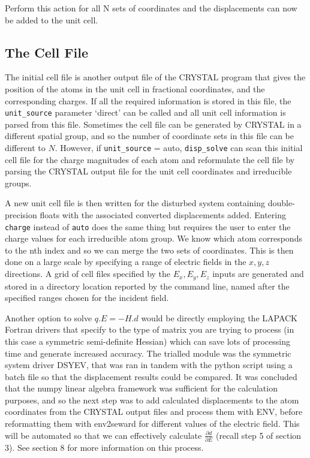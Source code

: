 \documentclass[10pt]{article}
\begin{document}
Perform this action for all N sets of coordinates and the displacements can now be added to the unit cell.
\subsection{The Cell File}

The initial cell file is another output file of the CRYSTAL program that gives the position of the atoms in the unit cell in fractional coordinates, and the corresponding charges. If all the required information is stored in this file, the \texttt{unit\_source} parameter `direct' can be called and all unit cell information is parsed from this file. Sometimes the cell file can be generated by CRYSTAL in a different spatial group, and so the number of coordinate sets in this file can be different to $N$. However, if \texttt{unit\_source} = auto, \texttt{disp\_solve} can scan this initial cell file for the charge magnitudes of each atom and reformulate the cell file by parsing the CRYSTAL output file for the unit cell coordinates and irreducible groups.

A new unit cell file is then written for the disturbed system containing double-precision floats with the associated converted displacements added. Entering \texttt{charge} instead of \texttt{auto} does the same thing but requires the user to enter the charge values for each irreducible atom group. We know which atom corresponds to the nth index and so we can merge the two sets of coordinates. This is then done on a large scale by specifying a range of electric fields in the $x,y,z$ directions. A grid of cell files specified by the $E_x,E_y,E_z$ inputs are generated and stored in a directory location reported by the command line, named after the specified ranges chosen for the incident field.

Another option to solve $q.E = -H.d$ would be directly employing the LAPACK Fortran drivers that specify to the type of matrix you are trying to process (in this case a symmetric semi-definite Hessian) which can save lots of processing time and generate increased accuracy. The trialled module was the symmetric system driver DSYEV, that was ran in tandem with the python script using a batch file so that the displacement results could be compared. It was concluded that the numpy linear algebra framework was sufficient for the calculation purposes, and so the next step was to add calculated displacements to the atom coordinates from the CRYSTAL output files and process them with ENV, before reformatting them with env2seward for different values of the electric field. This will be automated so that we can effectively calculate $\frac{\partial d}{\partial E}$ (recall step 5 of section 3). See section 8 for more information on this process.
\end{document}
